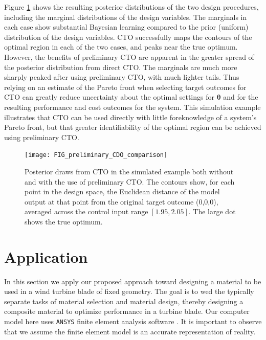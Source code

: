 \documentclass[12pt]{article}
\begin{document}
%
Figure \ref{fig:toy_sim_results} shows the resulting posterior distributions of the two design procedures, including the marginal distributions of the design variables. 
%
The marginals in each case show substantial Bayesian learning compared to the prior (uniform) distribution of the design variables. 
%
CTO successfully maps the contours of the optimal region in each of the two cases, and peaks near the true optimum. 
%
However, the benefits of preliminary CTO are apparent in the greater spread of the posterior distribution from direct CTO.
%
The marginals are much more sharply peaked after using preliminary CTO, with much lighter tails.
%
Thus relying on an estimate of the Pareto front when selecting target outcomes for CTO can greatly reduce uncertainty about the optimal settings for $\boldsymbol\theta$ and for the resulting performance and cost outcomes for the system.
%
%
This simulation example illustrates that CTO can be used directly with little foreknowledge of a system's Pareto front, but that greater identifiability of the optimal region can be achieved using preliminary CTO.

\begin{figure}
\centering
\texttt{[image: FIG\_preliminary\_CDO\_comparison]}
\caption{Posterior draws from CTO in the simulated example both without and with the use of preliminary CTO. The contours show, for each point in the design space, the Euclidean distance of the model output at that point from the original target outcome (0,0,0), averaged across the control input range $[1.95,2.05]$. The large dot shows the true optimum.}
\label{fig:toy_sim_results}
\end{figure}



\section{Application}\label{application}

In this section we apply our proposed approach toward designing a material to be used in a wind turbine blade of fixed geometry. 
%
The goal is to wed the typically separate tasks of material selection and material design, thereby designing a composite material to optimize performance in a turbine blade.
%
Our computer model here uses \texttt{ANSYS} finite element analysis software \citep{ansys}. 
It is important to observe that we assume the finite element model is an accurate representation of reality.
\end{document}
